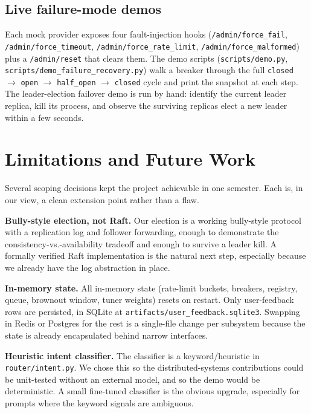 \documentclass[conference,letterpaper]{IEEEtran}
\begin{document}
\subsection{Live failure-mode demos}
Each mock provider exposes four fault-injection hooks
(\texttt{/admin/force\_fail}, \texttt{/admin/force\_timeout},
\texttt{/admin/force\_rate\_limit}, \texttt{/admin/force\_malformed})
plus a \texttt{/admin/reset} that clears them. The demo scripts
(\texttt{scripts/demo.py},
\texttt{scripts/demo\_failure\_recovery.py}) walk a breaker through
the full \texttt{closed} $\to$ \texttt{open} $\to$ \texttt{half\_open}
$\to$ \texttt{closed} cycle and print the snapshot at each step.
The leader-election failover demo is run by hand: identify the
current leader replica, kill its process, and observe the surviving
replicas elect a new leader within a few seconds.

\section{Limitations and Future Work}\label{sec:limits}
Several scoping decisions kept the project achievable in one
semester. Each is, in our view, a clean extension point rather than a
flaw.

\textbf{Bully-style election, not Raft.} Our election is a working
bully-style protocol with a replication log and follower
forwarding, enough to demonstrate the consistency-vs.-availability
tradeoff and enough to survive a leader kill. A formally verified
Raft implementation is the natural next step, especially because we
already have the log abstraction in place.

\textbf{In-memory state.} All in-memory state (rate-limit buckets,
breakers, registry, queue, brownout window, tuner weights) resets on
restart. Only user-feedback rows are persisted, in SQLite at
\texttt{artifacts/user\_feedback.sqlite3}. Swapping in Redis or
Postgres for the rest is a single-file change per subsystem because
the state is already encapsulated behind narrow interfaces.

\textbf{Heuristic intent classifier.} The classifier is a
keyword/heuristic in \texttt{router/intent.py}. We chose this so the
distributed-systems contributions could be unit-tested without an
external model, and so the demo would be deterministic. A small
fine-tuned classifier is the obvious upgrade, especially for prompts
where the keyword signals are ambiguous.
\end{document}
